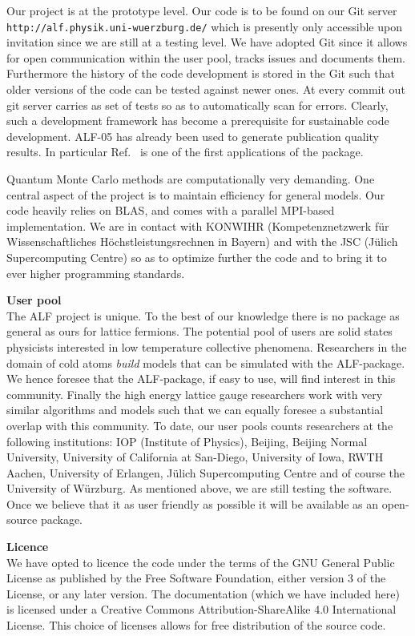 \documentclass[12pt]{article}
\begin{document}
Our project is at the prototype level.  Our code is to be found  on our Git server  \texttt{http://alf.physik.uni-wuerzburg.de/} which is presently only accessible  upon invitation since we are still at a testing level.  We have adopted Git since it allows for open communication within the user pool,  tracks issues and  documents them.   Furthermore the history of the code development is stored in the Git such that older versions of the code can be tested against newer ones.   At every commit out git server carries as set of tests so as to automatically scan for errors.   Clearly, such a development framework  has  become a prerequisite for sustainable code development.  ALF-05 has already been used to generate publication quality results. In particular  Ref.~\cite{Assaad16}   is one of the first applications of the package.  

Quantum Monte Carlo methods are  computationally very demanding. One central aspect of the project is to maintain  efficiency for general models.  Our code  heavily relies on BLAS, and comes with a parallel MPI-based implementation. We are in contact with KONWIHR   (Kompetenznetzwerk f\"ur Wissenschaftliches H\"ochstleistungsrechnen in Bayern)  and with the JSC (J\"ulich Supercomputing Centre)  so as to optimize further the code and to bring  it to ever higher programming standards.  

{\bf User pool } \\ 
The ALF project  is unique. To the best of our knowledge  there is no package as general as ours for lattice fermions. The potential pool of users are solid states physicists interested in low  temperature collective phenomena.    Researchers in the domain of cold atoms {\it build} models that can be simulated with the ALF-package. We hence foresee that the ALF-package, if easy to use, will find interest in this community. Finally  the high energy lattice gauge  researchers work with very similar algorithms and models such that we can equally  foresee  a substantial overlap with this community.   To date,  our user pools counts researchers at the following institutions:  IOP (Institute of Physics), Beijing,  Beijing Normal University, University of California at San-Diego,  University of Iowa,  RWTH Aachen, University of Erlangen, J\"ulich Supercomputing Centre and of course the  University of W\"urzburg.   As mentioned above,  we are still testing the software. Once we believe that it as user friendly as possible it will be available as an open-source package. 

{\bf Licence} \\ 
We have opted to licence the code under  the terms of the GNU General Public License as published by
the Free Software Foundation, either version 3 of the License, or any later version.   The documentation (which we have included here)  is licensed under a Creative Commons Attribution-ShareAlike 4.0 International License.  This choice of licenses allows for free distribution of the source code. 
\end{document}
